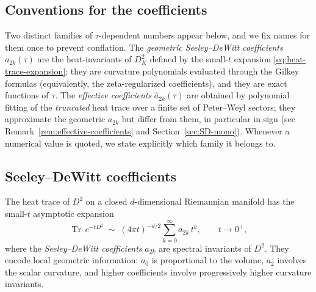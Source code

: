 \documentclass[12pt]{article}
\theoremstyle{definition}
\theoremstyle{remark}
\DeclareMathOperator{\Tr}{Tr}
\begin{document}
\subsection{Conventions for the coefficients}
\label{subsec:conventions}

Two distinct families of $\tau$-dependent numbers appear below, and we
fix names for them once to prevent conflation.  The
\emph{geometric Seeley--DeWitt coefficients} $a_{2k}(\tau)$ are the
heat-invariants of $D_K^2$ defined by the small-$t$ expansion
\eqref{eq:heat-trace-expansion}; they are curvature polynomials
evaluated through the Gilkey formulas \cite{Gilkey1995} (equivalently,
the zeta-regularized coefficients), and they are exact functions of
$\tau$.  The \emph{effective coefficients} $\hat{a}_{2k}(\tau)$ are
obtained by polynomial fitting of the \emph{truncated} heat trace over
a finite set of Peter--Weyl sectors; they approximate the geometric
$a_{2k}$ but differ from them, in particular in sign (see
Remark~\ref{rem:effective-coefficients} and
Section~\ref{sec:SD-mono}).  Whenever a numerical value is quoted, we
state explicitly which family it belongs to.


\subsection{Seeley--DeWitt coefficients}

The heat trace of $D^2$ on a closed $d$-dimensional Riemannian
manifold has the small-$t$ asymptotic expansion
\cite{Gilkey1995, Vassilevich2003}
\begin{equation}\label{eq:heat-trace-expansion}
  \Tr\, e^{-tD^2} \;\sim\; (4\pi t)^{-d/2}
  \sum_{k=0}^{\infty} a_{2k}\, t^k,
  \qquad t \to 0^+,
\end{equation}
where the \emph{Seeley--DeWitt coefficients} $a_{2k}$ are spectral
invariants of $D^2$.  They encode local geometric information: $a_0$
is proportional to the volume, $a_2$ involves the scalar curvature,
and higher coefficients involve progressively higher curvature
invariants.
\end{document}
